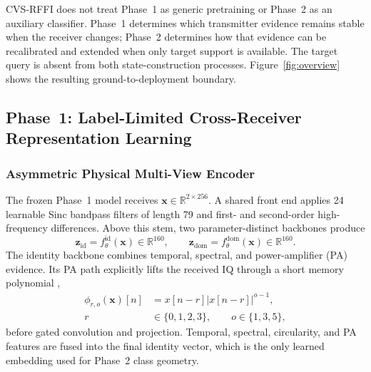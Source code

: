 \documentclass[journal]{IEEEtran}
\newcommand{\method}{CVS-RFFI}
\begin{document}
\method{} does not treat Phase~1 as generic pretraining or Phase~2 as an auxiliary classifier. Phase~1 determines which transmitter evidence remains stable when the receiver changes; Phase~2 determines how that evidence can be recalibrated and extended when only target support is available. The target query is absent from both state-construction processes. Figure~\ref{fig:overview} shows the resulting ground-to-deployment boundary.

\subsection{Phase~1: Label-Limited Cross-Receiver Representation Learning}

\subsubsection{Asymmetric Physical Multi-View Encoder}

The frozen Phase~1 model receives \(\mathbf{x}\in\mathbb{R}^{2\times256}\). A shared front end applies 24 learnable Sinc bandpass filters of length 79 \cite{ravanelli2018sincnet} and first- and second-order high-frequency differences. Above this stem, two parameter-distinct backbones produce
\begin{equation}
\mathbf{z}_{\mathrm{id}}=f_{\theta}^{\mathrm{id}}(\mathbf{x})\in\mathbb{R}^{160},
\qquad
\mathbf{z}_{\mathrm{dom}}=f_{\theta}^{\mathrm{dom}}(\mathbf{x})\in\mathbb{R}^{160}.
\label{eq:p1_features}
\end{equation}
The identity backbone combines temporal, spectral, and power-amplifier (PA) evidence. Its PA path explicitly lifts the received IQ through a short memory polynomial \cite{ding2004memory},
\begin{equation}
\begin{aligned}
\phi_{r,o}(\mathbf{x})[n]
&=x[n-r]|x[n-r]|^{o-1},\\
r&\in\{0,1,2,3\},\qquad o\in\{1,3,5\},
\end{aligned}
\label{eq:pa_lift}
\end{equation}
before gated convolution and projection. Temporal, spectral, circularity, and PA features are fused into the final identity vector, which is the only learned embedding used for Phase~2 class geometry.
\end{document}
